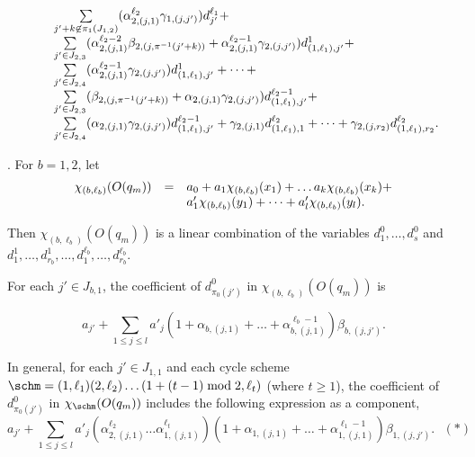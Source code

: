 {\[\begin{array}{l c l}
%
& & \sum \limits_{j'+k \not \in \pi_1(J_{1,2})} (\alpha^{\ell_2}_{2,(j,1)} \gamma_{1,(j, j')}) d^{\ell_1}_{j'}+ \\
%
& & \sum \limits_{j' \in J_{2,3}} (\alpha^{\ell_2-2}_{2,(j,1)}\beta_{2,(j, \pi^{-1}(j'+k))}+ \alpha^{\ell_2-1}_{2,(j,1)}\gamma_{2,(j,j')}) d^1_{(1,\ell_1),j'} +  \\
%
& & \sum \limits_{j' \in J_{2,4}} (\alpha^{\ell_2-1}_{2,(j,1)} \gamma_{2,(j,j')}) d^1_{(1,\ell_1),j'} + \dots + \\
%
& & \sum \limits_{j' \in J_{2,3}} (\beta_{2,(j, \pi^{-1}(j'+k))}+ \alpha_{2,(j,1)}\gamma_{2,(j,j')}) d^{\ell_2-1}_{(1,\ell_1), j'} + \\
%
& &  \sum \limits_{j' \in J_{2,4}} (\alpha_{2,(j,1)} \gamma_{2,(j,j')}) d^{\ell_2-1}_{(1,\ell_1), j'} + \gamma_{2,(j, 1)} d^{\ell_2}_{(1,\ell_1), 1} +  \dots + \gamma_{2,(j,r_2)} d^{\ell_2}_{(1,\ell_1), r_2}.
\end{array} 
\]
}

\smallskip

. For $b=1,2$, let 
\[
\begin{array}{l c l}
\chi_{(b,\ell_b)}(O(q_m)) & = & a_0 + a_1 \chi_{(b,\ell_b)}(x_1) + \dots a_k \chi_{(b,\ell_b)}(x_k) + \\
& & a'_1 \chi_{(b,\ell_b)}(y_1) + \dots + a'_l \chi_{(b,\ell_b)}(y_l).
\end{array}
\] 

Then $\chi_{(b,\ell_b)}(O(q_m))$ is a linear combination of the variables $d^0_1,\dots, d^0_s$ and $d^1_1,\dots, d^1_{r_b}, \dots, d^{\ell_b}_1,\dots, d^{\ell_b}_{r_b}$.

For each $j' \in J_{b,1}$, the coefficient of $d^0_{\pi_0(j')}$ in $\chi_{(b,\ell_b)}(O(q_m))$ is 

\[a_{j'} + \sum \limits_{1 \le j \le l} a'_j (1+\alpha_{b,(j,1)} + \dots +\alpha^{\ell_b-1}_{b,(j,1)})\beta_{b,(j,j')}.\]

In general, for each $j' \in J_{1,1}$ and each cycle scheme $\schm=(1,\ell_1)(2,\ell_2) \dots (1+(t-1) \bmod 2,\ell_{t})$ (where $t \ge 1$), the coefficient of $d^0_{\pi_0(j')}$ in $\chi_{\schm}(O(q_m))$ includes the following expression as a component,
%
\[a_{j'} + \sum \limits_{1 \le j \le l} a'_j (\alpha^{\ell_2}_{2,(j,1)} \dots \alpha^{\ell_t}_{1,(j,1)}) (1+\alpha_{1,(j,1)} + \dots +\alpha^{\ell_1-1}_{1,(j,1)})\beta_{1,(j,j')}. \ \ \  (\ast)\]

